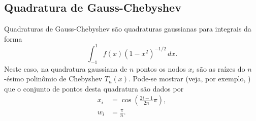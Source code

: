 \subsection{Quadratura de Gauss-Chebyshev}

Quadraturas de Gauss-Chebyshev são quadraturas gaussianas para integrais da forma
\begin{equation}
  \int_{-1}^1 f(x)(1-x^2)^{-1/2}\,dx.
\end{equation}
Neste caso, na quadratura gaussiana de $n$ pontos os nodos $x_i$ são as raízes do $n$-ésimo polinômio de Chebyshev $T_n(x)$. Pode-se mostrar (veja, por exemplo, \cite[Cap. 7, Sec. 4.1]{Isaacson1994a}) que o conjunto de pontos desta quadratura são dados por
\begin{align}
  x_i &= \cos\left(\frac{2i-1}{2n}\pi\right),\\
  w_i &= \frac{\pi}{n}.
\end{align}

